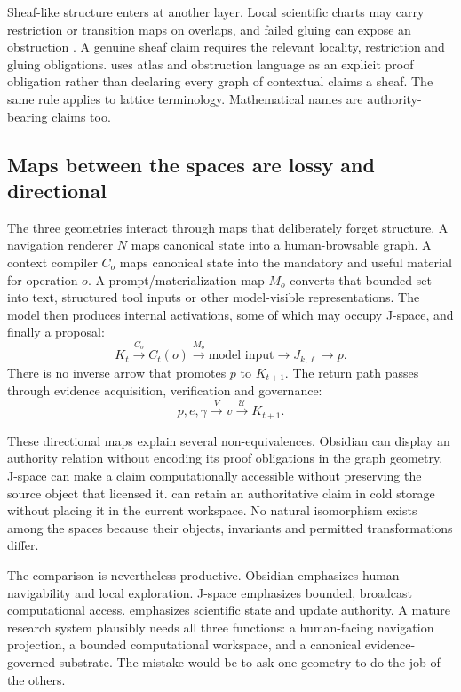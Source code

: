 Sheaf-like structure enters at another layer. Local scientific charts may carry restriction or transition maps on overlaps, and failed gluing can expose an obstruction \cite{abramsky2011,gibson2026,olivieri2026sheaf}. A genuine sheaf claim requires the relevant locality, restriction and gluing obligations. \RAKL{} uses atlas and obstruction language as an explicit proof obligation rather than declaring every graph of contextual claims a sheaf. The same rule applies to lattice terminology. Mathematical names are authority-bearing claims too.

\subsection{Maps between the spaces are lossy and directional}

The three geometries interact through maps that deliberately forget structure. A navigation renderer \(N\) maps canonical state into a human-browsable graph. A context compiler \(C_o\) maps canonical state into the mandatory and useful material for operation \(o\). A prompt/materialization map \(M_o\) converts that bounded set into text, structured tool inputs or other model-visible representations. The model then produces internal activations, some of which may occupy J-space, and finally a proposal:
\[
K_t
\overset{C_o}{\longrightarrow}
C_t(o)
\overset{M_o}{\longrightarrow}
\text{model input}
\longrightarrow
J_{k,\ell}
\longrightarrow
p .
\]
There is no inverse arrow that promotes \(p\) to \(K_{t+1}\). The return path passes through evidence acquisition, verification and governance:
\[
p,e,\gamma
\overset{V}{\longrightarrow}
v
\overset{\mathcal U}{\longrightarrow}
K_{t+1}.
\]

These directional maps explain several non-equivalences. Obsidian can display an authority relation without encoding its proof obligations in the graph geometry. J-space can make a claim computationally accessible without preserving the source object that licensed it. \RAKL{} can retain an authoritative claim in cold storage without placing it in the current workspace. No natural isomorphism exists among the spaces because their objects, invariants and permitted transformations differ.

The comparison is nevertheless productive. Obsidian emphasizes human navigability and local exploration. J-space emphasizes bounded, broadcast computational access. \RAKL{} emphasizes scientific state and update authority. A mature research system plausibly needs all three functions: a human-facing navigation projection, a bounded computational workspace, and a canonical evidence-governed substrate. The mistake would be to ask one geometry to do the job of the others.
